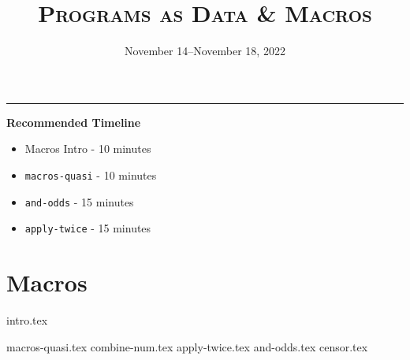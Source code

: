 \documentclass{exam}
\title{\textsc{Programs as Data \& Macros}}
\date{November 14--November 18, 2022}
\begin{document}
\maketitle
\rule{\textwidth}{0.15em}

\begin{guide}
\begin{blocksection}
    \textbf{Recommended Timeline}
    \begin{itemize}
        \item Macros Intro - 10 minutes
        \item \lstinline{macros-quasi} - 10 minutes
        \item \lstinline{and-odds} - 15 minutes
        \item \lstinline{apply-twice} - 15 minutes
    \end{itemize}
\end{blocksection}
\newpage
\end{guide}

\section{Macros}
{intro.tex}
\begin{questions}
{macros-quasi.tex}
{combine-num.tex}
{apply-twice.tex}
{and-odds.tex}
{censor.tex}
\end{questions}
\end{document}

